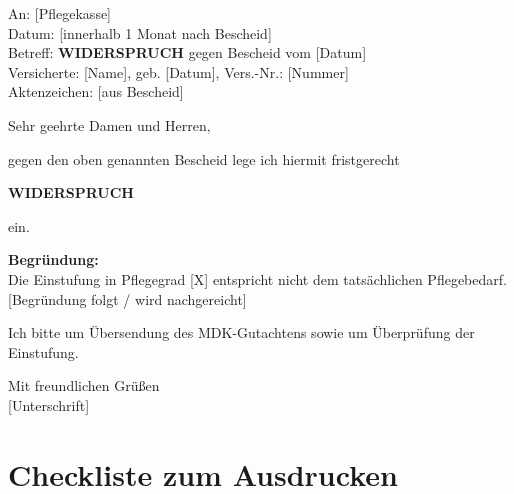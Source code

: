 \documentclass[11pt,a4paper]{article}
\begin{document}
\begin{graybox}
\small
An: [Pflegekasse]\\
Datum: [innerhalb 1 Monat nach Bescheid]\\
Betreff: \textbf{WIDERSPRUCH} gegen Bescheid vom [Datum]\\
Versicherte: [Name], geb. [Datum], Vers.-Nr.: [Nummer]\\
Aktenzeichen: [aus Bescheid]

\vspace{0.3cm}
Sehr geehrte Damen und Herren,

gegen den oben genannten Bescheid lege ich hiermit fristgerecht

\begin{center}
\textbf{\Large WIDERSPRUCH}
\end{center}

ein.

\textbf{Begründung:}\\
Die Einstufung in Pflegegrad [X] entspricht nicht dem tatsächlichen Pflegebedarf. [Begründung folgt / wird nachgereicht]

Ich bitte um Übersendung des MDK-Gutachtens sowie um Überprüfung der Einstufung.

Mit freundlichen Grüßen\\
{[Unterschrift]}
\end{graybox}

\section{Checkliste zum Ausdrucken}
\end{document}
